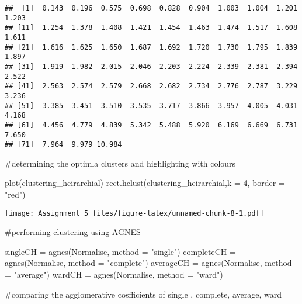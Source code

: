 \documentclass[
]{article}
\newenvironment{Shaded}{\begin{snugshade}}{\end{snugshade}}
\newcommand{\AttributeTok}[1]{\textcolor[rgb]{0.77,0.63,0.00}{#1}}
\newcommand{\DecValTok}[1]{\textcolor[rgb]{0.00,0.00,0.81}{#1}}
\newcommand{\FunctionTok}[1]{\textcolor[rgb]{0.00,0.00,0.00}{#1}}
\newcommand{\NormalTok}[1]{#1}
\newcommand{\OtherTok}[1]{\textcolor[rgb]{0.56,0.35,0.01}{#1}}
\newcommand{\SpecialCharTok}[1]{\textcolor[rgb]{0.00,0.00,0.00}{#1}}
\newcommand{\StringTok}[1]{\textcolor[rgb]{0.31,0.60,0.02}{#1}}
\begin{document}
\begin{verbatim}
##  [1]  0.143  0.196  0.575  0.698  0.828  0.904  1.003  1.004  1.201  1.203
## [11]  1.254  1.378  1.408  1.421  1.454  1.463  1.474  1.517  1.608  1.611
## [21]  1.616  1.625  1.650  1.687  1.692  1.720  1.730  1.795  1.839  1.897
## [31]  1.919  1.982  2.015  2.046  2.203  2.224  2.339  2.381  2.394  2.522
## [41]  2.563  2.574  2.579  2.668  2.682  2.734  2.776  2.787  3.229  3.236
## [51]  3.385  3.451  3.510  3.535  3.717  3.866  3.957  4.005  4.031  4.168
## [61]  4.456  4.779  4.839  5.342  5.488  5.920  6.169  6.669  6.731  7.650
## [71]  7.964  9.979 10.984
\end{verbatim}

\#determining the optimla clusters and highlighting with colours

\begin{Shaded}
\begin{Highlighting}[]
\FunctionTok{plot}\NormalTok{(clustering\_heirarchial)}
\FunctionTok{rect.hclust}\NormalTok{(clustering\_heirarchial,}\AttributeTok{k =} \DecValTok{4}\NormalTok{, }\AttributeTok{border =} \StringTok{"red"}\NormalTok{)}
\end{Highlighting}
\end{Shaded}

\texttt{[image: Assignment\_5\_files/figure-latex/unnamed-chunk-8-1.pdf]}

\#performing clustering using AGNES

\begin{Shaded}
\begin{Highlighting}[]
\NormalTok{singleCH }\OtherTok{=} \FunctionTok{agnes}\NormalTok{(Normalise, }\AttributeTok{method =} \StringTok{"single"}\NormalTok{)}
\NormalTok{completeCH }\OtherTok{=} \FunctionTok{agnes}\NormalTok{(Normalise, }\AttributeTok{method =} \StringTok{"complete"}\NormalTok{)}
\NormalTok{averageCH }\OtherTok{=} \FunctionTok{agnes}\NormalTok{(Normalise, }\AttributeTok{method =} \StringTok{"average"}\NormalTok{)}
\NormalTok{wardCH }\OtherTok{=} \FunctionTok{agnes}\NormalTok{(Normalise, }\AttributeTok{method =} \StringTok{"ward"}\NormalTok{)}
\end{Highlighting}
\end{Shaded}

\#comparing the agglomerative cosfficients of single , complete,
average, ward

\begin{Shaded}
\end{Shaded}
\end{document}
